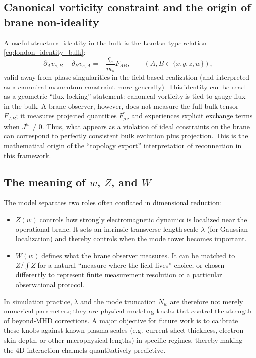 \documentclass[11pt]{article}
\newcommand{\Z}{Z}              %
\newcommand{\W}{W}              %
\newcommand{\Proj}[1]{\overline{#1}} %
\begin{document}
\subsection{Canonical vorticity constraint and the origin of brane non-ideality}
\label{sec:vorticity_identity}
A useful structural identity in the bulk is the London-type relation
\eqref{eq:london_identity_bulk}:
\begin{equation}
\partial_A v_{s,B}-\partial_B v_{s,A}
= -\frac{q_s}{m_s}F_{AB},
\qquad (A,B\in\{x,y,z,w\}),
\label{eq:discussion_london}
\end{equation}
valid away from phase singularities in the field-based realization (and interpreted
as a canonical-momentum constraint more generally). This identity can be read as a
geometric ``flux locking'' statement: canonical vorticity is tied to gauge flux in
the bulk. A brane observer, however, does not measure the full bulk tensor \(F_{AB}\);
it measures projected quantities \(\Proj{F_{\mu\nu}}\) and experiences explicit exchange
terms when \(J^w\neq 0\). Thus, what appears as a violation of ideal constraints on the
brane can correspond to perfectly consistent bulk evolution plus projection. This is
the mathematical origin of the ``topology export'' interpretation of reconnection in
this framework.

\subsection{The meaning of \texorpdfstring{$w$}{w}, \texorpdfstring{$\Z$}{Z}, and \texorpdfstring{$\W$}{W}}
The model separates two roles often conflated in dimensional reduction:
\begin{itemize}[leftmargin=1.7em]
\item \(\Z(w)\) controls how strongly electromagnetic dynamics is localized near the
operational brane. It sets an intrinsic transverse length scale \(\lambda\) (for
Gaussian localization) and thereby controls when the mode tower becomes important.
\item \(\W(w)\) defines what the brane observer measures. It can be matched to \(\Z/\!\int\Z\)
for a natural ``measure where the field lives'' choice, or chosen differently to
represent finite measurement resolution or a particular observational protocol.
\end{itemize}
In simulation practice, \(\lambda\) and the mode truncation \(N_w\) are therefore not
merely numerical parameters; they are physical modeling knobs that control the strength
of beyond-MHD corrections. A major objective for future work is to calibrate these knobs
against known plasma scales (e.g.\ current-sheet thickness, electron skin depth, or
other microphysical lengths) in specific regimes, thereby making the \(4\)D interaction
channels quantitatively predictive.
\end{document}

